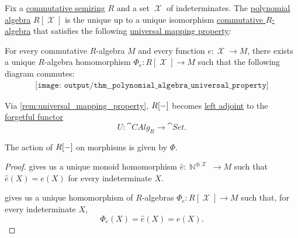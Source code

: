 \begin{theorem}\label{thm:polynomial_algebra_universal_property}
  Fix a \hyperref[def:semiring/commutative]{commutative semiring} \( R \) and a set \( \mscrX \) of indeterminates. The \hyperref[def:polynomial_algebra]{polynomial algebra} \( R[\mscrX] \) is the unique up to a unique isomorphism \hyperref[def:algebra_over_semiring/commutative]{commutative \( R \)-algebra} that satisfies the following \hyperref[rem:universal_mapping_property]{universal mapping property}:
  \begin{displayquote}
    For every commutative \( R \)-algebra \( M \) and every function \( e: \mscrX \to M \), there exists a unique \( R \)-algebra homomorphism \( \Phi_e: R[\mscrX] \to M \) such that the following diagram commutes:
    \begin{equation}\label{eq:thm:polynomial_algebra_universal_property/diagram}
      \begin{aligned}
        \texttt{[image: output/thm\_\_polynomial\_algebra\_universal\_property]}
      \end{aligned}
    \end{equation}
  \end{displayquote}
\end{theorem}
\begin{comments}
  \item Via \cref{rem:universal_mapping_property}, \( R[\anon*] \) becomes \hyperref[def:category_adjunction]{left adjoint} to the \hyperref[def:concrete_category]{forgetful functor}
  \begin{equation*}
    U: \cat{CAlg}_R \to \cat{Set}.
  \end{equation*}

  The action of \( R[\anon*] \) on morphisms is given by \( \Phi \).
\end{comments}
\begin{proof}
   gives us a unique monoid homomorphism \( \widehat{e}: \BbbN^{\oplus \mscrX} \to M \) such that \( \widehat{e}(X) = e(X) \) for every indeterminate \( X \).

   gives us a unique homomorphism of \( R \)-algebras \( \Phi_e: R[\mscrX] \to M \) such that, for every indeterminate \( X \),
  \begin{equation*}
    \Phi_e(X) = \widehat{e}(X) = e(X).
  \end{equation*}
\end{proof}

